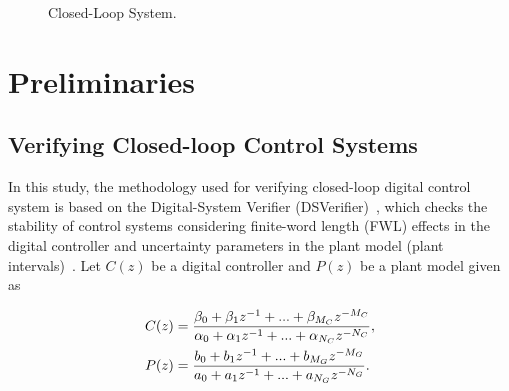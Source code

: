 \documentclass{sig-alternate-05-2015}
\begin{document}
\begin{figure}
\centering
{}
 \caption{Closed-Loop System. \label{fig:closed-system}}
\end{figure}

\section{Preliminaries}

\subsection{Verifying Closed-loop Control Systems}
\label{verifying-closed-loop-control-systems}

In this study, the methodology used for verifying closed-loop digital control system is based on the Digital-System Verifier (DSVerifier)~\cite{IsmailBCFF15}, which checks the stability of control systems considering finite-word length (FWL) effects in the digital controller and uncertainty parameters in the plant model (plant intervals)~\cite{Bessa16}. Let $C(z)$ be a digital controller and $P(z)$ be a plant model given as

\begin{align}
\small
\label{controller_plant_tf}
C(z)&=\frac{\beta_{0}+\beta_{1}z^{-1}+...+\beta_{M_C}z^{-M_C}}{\alpha_{0}+\alpha_{1}z^{-1}+...+\alpha_{N_C}z^{-N_C}}, \\
P(z)&=\frac{b_{0}+b_{1}z^{-1}+...+b_{M_G}z^{-M_G}}{a_{0}+a_{1}z^{-1}+...+a_{N_G}z^{-N_G}}.
\end{align}
\end{document}
